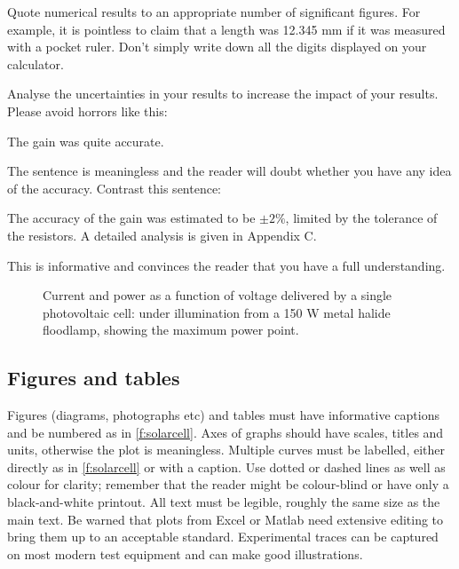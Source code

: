 Quote numerical results to an appropriate number of significant figures. For
example, it is pointless to claim that a length was 12.345 mm if it was measured
with a pocket ruler. Don’t simply write down all the digits displayed on your
calculator.

Analyse the uncertainties in your results to increase the impact of your
results. Please avoid horrors like this:

\begin{displayquote}
    The gain was quite accurate.
\end{displayquote}

The sentence is meaningless and the reader will doubt whether you have any idea
of the accuracy. Contrast this sentence:

\begin{displayquote}
    The accuracy of the gain was estimated to be \(\pm2\%\), limited by the
    tolerance of the resistors. A detailed analysis is given in Appendix C.
\end{displayquote}

This is informative and convinces the reader that you have a full understanding.

\begin{figure}[htb]
    \caption[Current and Power as A Function of Voltage Delivered by A Single
        Photovoltaic Cell]{Current and power as a function of voltage delivered by a
        single photovoltaic cell: under illumination from a 150 W metal halide
        floodlamp, showing the maximum power point.}\label{f:solarcell}
\end{figure}

\subsection{Figures and tables}

Figures (diagrams, photographs etc) and tables must have informative captions
and be numbered as in \autoref{f:solarcell}. Axes of graphs should have scales,
titles and units, otherwise the plot is meaningless. Multiple curves must be
labelled, either directly as in \autoref{f:solarcell} or with a caption. Use
dotted or dashed lines as well as colour for clarity; remember that the reader
might be colour-blind or have only a black-and-white printout. All text must be
legible, roughly the same size as the main text. Be warned that plots from Excel
or Matlab need extensive editing to bring them up to an acceptable standard.
Experimental traces can be captured on most modern test equipment and can make
good illustrations.

